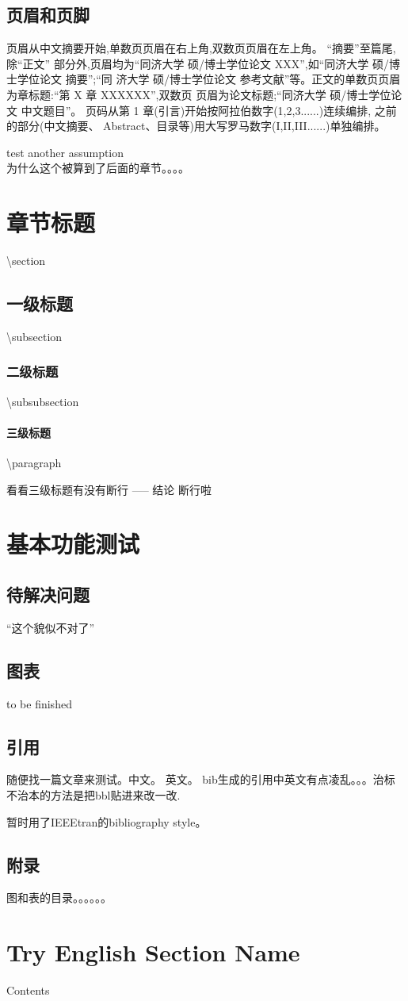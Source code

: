 	\subsection{页眉和页脚}
	页眉从中文摘要开始,单数页页眉在右上角,双数页页眉在左上角。
	“摘要”至篇尾,除“正文” 部分外,页眉均为“同济大学 
	硕/博士学位论文 XXX”,如“同济大学 硕/博士学位论文 摘要”;“同 济大学
	 硕/博士学位论文 参考文献”等。正文的单数页页眉为章标题:“第 X 章
	  XXXXXX”,双数页 页眉为论文标题;“同济大学 硕/博士学位论文 中文题目”。
页码从第 1 章(引言)开始按阿拉伯数字(1,2,3......)连续编排,
之前的部分(中文摘要、 Abstract、目录等)用大写罗马数字(I,II,III......)单独编排。


test another assumption\\
为什么这个被算到了后面的章节。。。。

\clearpage
\section{章节标题}
	\textbackslash section
\subsection{一级标题} 
	\textbackslash subsection
	
\subsubsection{二级标题}
	\textbackslash subsubsection
	
\paragraph{三级标题}
	\textbackslash paragraph
	
看看三级标题有没有断行 ----- 结论 断行啦\\


\clearpage
\section{基本功能测试}
\subsection{待解决问题}
	``这个貌似不对了''
		


\subsection{图表}
	to be finished

	
\subsection{引用}
	随便找一篇文章来测试。中文\cite{余胜泉2000}。 英文\cite{liu2010system}。
	bib生成的引用中英文有点凌乱。。。治标不治本的方法是把bbl贴进来改一改.
	
	暂时用了IEEEtran的bibliography style。


\subsection{附录}

	图和表的目录。。。。。。
	
	
\clearpage
\section{Try English Section Name}
		Contents

\clearpage